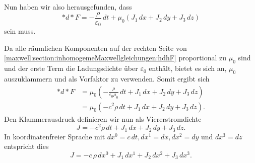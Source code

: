 Nun haben wir also herausgefunden, dass
\begin{equation}
	\ast d {\ast} F = -\frac{\rho}{\varepsilon_0}\,dt + \mu_0 (J_1 \,dx +  J_2 \,dy +  J_3 \,dz)
	\label{maxwell:section:inhomogemeMaxwellgleichungen:hdhF}
\end{equation}
sein muss.

Da alle räumlichen Komponenten auf der rechten Seite von \eqref{maxwell:section:inhomogemeMaxwellgleichungen:hdhF} proportional zu $\mu_0$ sind und der erste Term die Ladungsdichte über $\varepsilon_0$ enthält, bietet es sich an, $\mu_0$ auszuklammern und als Vorfaktor zu verwenden.
Somit ergibt sich
\begin{align*}
	\ast d {\ast} F
	& = \mu_0 \left( -\frac{\rho}{\varepsilon_0 \mu_0}\,dt + J_1\, dx + J_2\, dy + J_3\, dz \right)\\[2ex]
	& = \mu_0 \left( -c^2 \rho \,dt + J_1 \,dx + J_2 \,dy + J_3 \,dz \right).
\end{align*}
Den Klammerausdruck definieren wir nun als Viererstromdichte
\begin{equation}
	J = -c^2 \rho\, dt + J_1 \,dx + J_2 \,dy + J_3 \,dz.
\end{equation}
In koordinatenfreier Sprache mit $dx^0 = c\,dt, dx^1 = dx,dx^2=dy$ und $dx^3 = dz$ entspricht dies
\begin{equation}
	J = -c\,\rho\,dx^0 + J_1 \,dx^1 + J_2 \,dx^2 + J_3 \,dx^3.
\end{equation}

